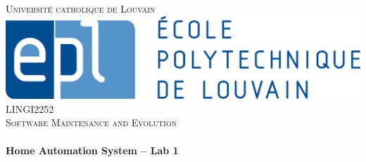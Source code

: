     \begin{titlepage}
        \center %


        \textsc{\LARGE Université catholique de Louvain }\\[1.5cm] %
        \includegraphics[scale=0.45]{epl.jpg}
         \\[0.5cm]
        \textsc{\Large LINGI2252}\\[0.5cm] %
        \textsc{\large Software Maintenance and Evolution}\\[0.5cm] %


        \HRule \\[0.4cm]
        { \huge \bfseries Home Automation System -- Lab 1}\\[0.4cm] %
        \HRule \\[1.5cm]



\end{titlepage}
